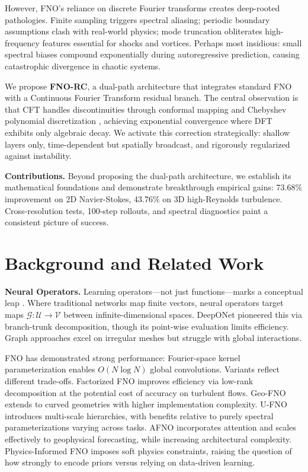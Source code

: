 \documentclass[11pt]{article}
\newcommand{\G}{\mathcal{G}}
\begin{document}
However, FNO's reliance on discrete Fourier transforms creates deep-rooted pathologies. Finite sampling triggers spectral aliasing; periodic boundary assumptions clash with real-world physics; mode truncation obliterates high-frequency features essential for shocks and vortices. Perhaps most insidious: small spectral biases compound exponentially during autoregressive prediction, causing catastrophic divergence in chaotic systems.

We propose \textbf{FNO-RC}, a dual-path architecture that integrates standard FNO with a Continuous Fourier Transform residual branch. The central observation is that CFT handles discontinuities through conformal mapping and Chebyshev polynomial discretization \citep{barnett2010conformal}, achieving exponential convergence where DFT exhibits only algebraic decay. We activate this correction strategically: shallow layers only, time-dependent but spatially broadcast, and rigorously regularized against instability.

\textbf{Contributions.} Beyond proposing the dual-path architecture, we establish its mathematical foundations and demonstrate breakthrough empirical gains: 73.68\% improvement on 2D Navier-Stokes, 43.76\% on 3D high-Reynolds turbulence. Cross-resolution tests, 100-step rollouts, and spectral diagnostics paint a consistent picture of success.

\section{Background and Related Work}

\textbf{Neural Operators.} Learning operators—not just functions—marks a conceptual leap \citep{kovachki2021neural,azizzadenesheli2024neural}. Where traditional networks map finite vectors, neural operators target maps $\G: \mathcal{U} \rightarrow \mathcal{V}$ between infinite-dimensional spaces. DeepONet \citep{lu2021learning,wang2021learning} pioneered this via branch-trunk decomposition, though its point-wise evaluation limits efficiency. Graph approaches \citep{li2020multipole,li2020neural} excel on irregular meshes but struggle with global interactions.

FNO \citep{Li2020FNO} has demonstrated strong performance: Fourier-space kernel parameterization enables $O(N \log N)$ global convolutions. Variants reflect different trade-offs. Factorized FNO \citep{tran2021factorized} improves efficiency via low-rank decomposition at the potential cost of accuracy on turbulent flows. Geo-FNO \citep{li2023geometry} extends to curved geometries with higher implementation complexity. U-FNO \citep{wen2022u} introduces multi-scale hierarchies, with benefits relative to purely spectral parameterizations varying across tasks. AFNO \citep{guibas2021adaptive,pathak2022fourcastnet} incorporates attention and scales effectively to geophysical forecasting, while increasing architectural complexity. Physics-Informed FNO \citep{li2021physics} imposes soft physics constraints, raising the question of how strongly to encode priors versus relying on data-driven learning.
\end{document}
